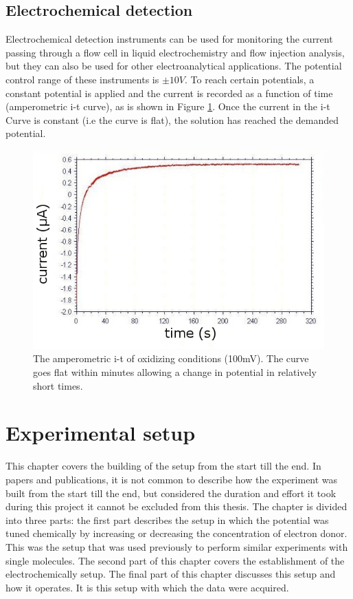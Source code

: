\documentclass[twoside,single]{lion-msc}
\begin{document}
\section{Electrochemical detection}
Electrochemical detection instruments can be used for monitoring the current passing through a flow cell in liquid electrochemistry and flow injection analysis, but they can also be used for other electroanalytical applications. The potential control range of these instruments is $\pm10V$. To reach certain potentials, a constant potential is applied and the current is recorded as a function of time (amperometric i-t curve), as is shown in Figure \ref{amp_curve}. Once the current in the i-t Curve is constant (i.e the curve is flat), the solution has reached the demanded potential. 

\begin{figure}[ht!]
\centering
\includegraphics[width=.95 \linewidth]{it100mV}
\caption{The amperometric i-t of oxidizing conditions (100mV). The curve goes flat within minutes allowing a change in potential in relatively short times.}
\label{amp_curve}
\end{figure}



\chapter{Experimental setup}

This chapter covers the building of the setup from the start till the end. In papers and publications, it is not  common to describe how the experiment was built from the start till the end, but considered the duration and effort it took during this project it cannot be excluded from this thesis. The chapter is divided into three parts: the first part describes the setup in which the potential was tuned chemically by increasing or decreasing the concentration of  electron donor. This was the setup that was used previously to perform similar experiments with single molecules. The second part of this chapter covers the establishment of the electrochemically setup. The final part of this chapter discusses this setup and how it operates. It is this setup with which the data were acquired.
\end{document}
